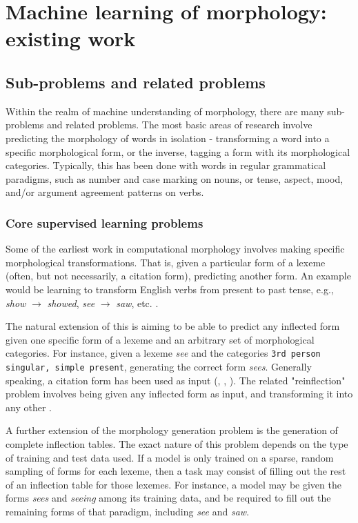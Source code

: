 \chapter{Machine learning of morphology: existing work}

\section{Sub-problems and related problems}

Within the realm of machine understanding of morphology, there are many sub-problems and related problems. The most basic areas of research involve predicting the morphology of words in isolation - transforming a word into a specific morphological form, or the inverse, tagging a form with its morphological categories. Typically, this has been done with words in regular grammatical paradigms, such as number and case marking on nouns, or tense, aspect, mood, and/or argument agreement patterns on verbs. 

\subsection{Core supervised learning problems}

Some of the earliest work in computational morphology involves making specific morphological transformations. That is, given a particular form of a lexeme (often, but not necessarily, a citation form), predicting another form. An example would be learning to transform English verbs from present to past tense, e.g., \textit{show} $\rightarrow$ \textit{showed}, \textit{see} $\rightarrow$ \textit{saw}, etc. \parencite{Dreyer2008}.

The natural extension of this is aiming to be able to predict any inflected form given one specific form of a lexeme and an arbitrary set of morphological categories. For instance, given a lexeme \textit{see} and the categories \texttt{3rd person singular, simple present}, generating the correct form \textit{sees}. Generally speaking, a citation form has been used as input (\cite{Durrett2013}, \cite{Faruqui2015}, \cite{Cotterell2017a}). The related "reinflection" problem involves being given any inflected form as input, and transforming it into any other \parencite{Cotterell2016}.

A further extension of the morphology generation problem is the generation of complete inflection tables. The exact nature of this problem depends on the type of training and test data used. If a model is only trained on a sparse, random sampling of forms for each lexeme, then a task may consist of filling out the rest of an inflection table for those lexemes. For instance, a model may be given the forms \textit{sees} and \textit{seeing} among its training data, and be required to fill out the remaining forms of that paradigm, including \textit{see} and \textit{saw}. 

